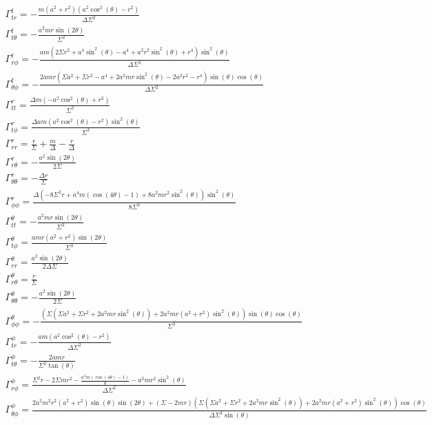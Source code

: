 \documentclass[10pt,a4paper]{report}
\begin{document}
\small\begin{align*}
\Gamma^t_{tr} = - \frac{m (a^{2} + r^{2}) (a^{2} \cos^{2}{(\theta )} - r^{2})}{\Delta \Sigma^{2}}\\
\Gamma^t_{t\theta} = - \frac{a^{2} m r \sin{(2 \theta )}}{\Sigma^{2}}\\
\Gamma^t_{r\phi} = - \frac{a m (2 \Sigma r^{2} + a^{4} \sin^{2}{(\theta )} - a^{4} + a^{2} r^{2} \sin^{2}{(\theta )} + r^{4}) \sin^{2}{(\theta )}}{\Delta \Sigma^{2}}\\
\Gamma^t_{\theta\phi} = - \frac{2 a m r (\Sigma a^{2} + \Sigma r^{2} - a^{4} + 2 a^{2} m r \sin^{2}{(\theta )} - 2 a^{2} r^{2} - r^{4}) \sin{(\theta )} \cos{(\theta )}}{\Delta \Sigma^{2}}\\
\Gamma^r_{tt} = \frac{\Delta m (- a^{2} \cos^{2}{(\theta )} + r^{2})}{\Sigma^{3}}\\
\Gamma^r_{t\phi} = \frac{\Delta a m (a^{2} \cos^{2}{(\theta )} - r^{2}) \sin^{2}{(\theta )}}{\Sigma^{3}}\\
\Gamma^r_{rr} = \frac{r}{\Sigma} + \frac{m}{\Delta} - \frac{r}{\Delta}\\
\Gamma^r_{r\theta} = - \frac{a^{2} \sin{(2 \theta )}}{2 \Sigma}\\
\Gamma^r_{\theta\theta} = - \frac{\Delta r}{\Sigma}\\
\Gamma^r_{\phi\phi} = \frac{\Delta (- 8 \Sigma^{2} r + a^{4} m (\cos{(4 \theta )} - 1) + 8 a^{2} m r^{2} \sin^{2}{(\theta )}) \sin^{2}{(\theta )}}{8 \Sigma^{3}}\\
\Gamma^\theta_{tt} = - \frac{a^{2} m r \sin{(2 \theta )}}{\Sigma^{3}}\\
\Gamma^\theta_{t\phi} = \frac{a m r (a^{2} + r^{2}) \sin{(2 \theta )}}{\Sigma^{3}}\\
\Gamma^\theta_{rr} = \frac{a^{2} \sin{(2 \theta )}}{2 \Delta \Sigma}\\
\Gamma^\theta_{r\theta} = \frac{r}{\Sigma}\\
\Gamma^\theta_{\theta\theta} = - \frac{a^{2} \sin{(2 \theta )}}{2 \Sigma}\\
\Gamma^\theta_{\phi\phi} = - \frac{(\Sigma (\Sigma a^{2} + \Sigma r^{2} + 2 a^{2} m r \sin^{2}{(\theta )}) + 2 a^{2} m r (a^{2} + r^{2}) \sin^{2}{(\theta )}) \sin{(\theta )} \cos{(\theta )}}{\Sigma^{3}}\\
\Gamma^\phi_{tr} = - \frac{a m (a^{2} \cos^{2}{(\theta )} - r^{2})}{\Delta \Sigma^{2}}\\
\Gamma^\phi_{t\theta} = - \frac{2 a m r}{\Sigma^{2} \tan{(\theta )}}\\
\Gamma^\phi_{r\phi} = \frac{\Sigma^{2} r - 2 \Sigma m r^{2} - \frac{a^{4} m (\cos{(4 \theta )} - 1)}{8} - a^{2} m r^{2} \sin^{2}{(\theta )}}{\Delta \Sigma^{2}}\\
\Gamma^\phi_{\theta\phi} = \frac{2 a^{2} m^{2} r^{2} (a^{2} + r^{2}) \sin{(\theta )} \sin{(2 \theta )} + (\Sigma - 2 m r) (\Sigma (\Sigma a^{2} + \Sigma r^{2} + 2 a^{2} m r \sin^{2}{(\theta )}) + 2 a^{2} m r (a^{2} + r^{2}) \sin^{2}{(\theta )}) \cos{(\theta )}}{\Delta \Sigma^{3} \sin{(\theta )}}\\
\end{align*}
\end{document}
